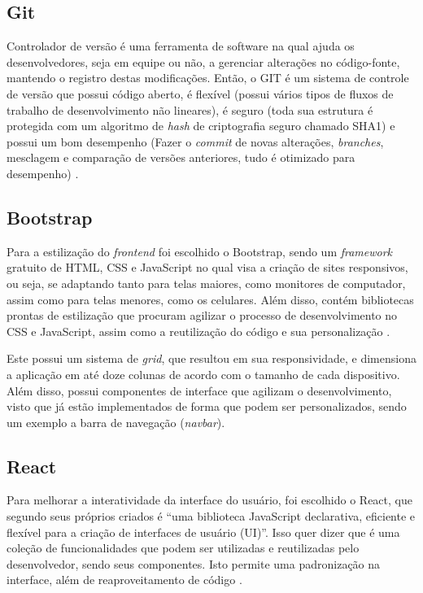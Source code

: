 \subsection{Git}
Controlador de versão é uma ferramenta de software na qual ajuda os desenvolvedores, seja em equipe ou não, a gerenciar alterações no código-fonte, mantendo o registro destas modificações. Então, o GIT é um sistema de controle de versão que possui código aberto, é flexível (possui vários tipos de fluxos de trabalho de desenvolvimento não lineares), é seguro (toda sua estrutura é protegida com um algoritmo de \textit{hash} de criptografia seguro chamado SHA1) e possui um bom desempenho (Fazer o \textit{commit} de novas alterações, \textit{branches}, mesclagem e comparação de versões anteriores, tudo é otimizado para desempenho) \cite{SANTACROCE}.

\subsection{Bootstrap}
Para a estilização do \textit{frontend} foi escolhido o Bootstrap, sendo um \textit{framework} gratuito de HTML, CSS e JavaScript no qual visa a criação de sites responsivos, ou seja, se adaptando tanto para telas maiores, como monitores de computador, assim como para telas menores, como os celulares. Além disso, contém bibliotecas prontas de estilização que procuram agilizar o processo de desenvolvimento no CSS e JavaScript, assim como a reutilização do código e sua personalização \cite{SPURLOCK}.

Este possui um sistema de \textit{grid}, que resultou em sua responsividade, e dimensiona a aplicação em até doze colunas de acordo com o tamanho de cada dispositivo. Além disso, possui componentes de interface que agilizam o desenvolvimento, visto que já estão implementados de forma que podem ser personalizados, sendo um exemplo a barra de navegação (\textit{navbar}).

\subsection{React}
Para melhorar a interatividade da interface do usuário, foi escolhido o React, que segundo seus próprios criados é “uma biblioteca JavaScript declarativa, eficiente e flexível para a criação de interfaces de usuário (UI)”. Isso quer dizer que é uma coleção de funcionalidades que podem ser utilizadas e reutilizadas pelo desenvolvedor, sendo seus componentes. Isto permite uma padronização na interface, além de reaproveitamento de código \cite{ZAMMETTI}.

